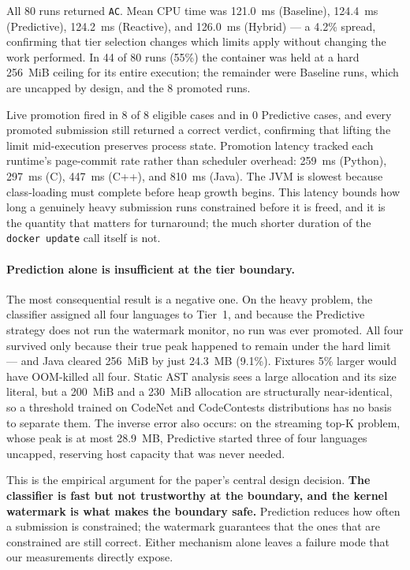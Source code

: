\documentclass[conference]{IEEEtran}
\begin{document}
All 80 runs returned \texttt{AC}. Mean CPU time was 121.0~ms (Baseline), 124.4~ms (Predictive), 124.2~ms (Reactive), and 126.0~ms (Hybrid) --- a 4.2\% spread, confirming that tier selection changes which limits apply without changing the work performed. In 44 of 80 runs (55\%) the container was held at a hard 256~MiB ceiling for its entire execution; the remainder were Baseline runs, which are uncapped by design, and the 8 promoted runs.

Live promotion fired in 8 of 8 eligible cases and in 0 Predictive cases, and every promoted submission still returned a correct verdict, confirming that lifting the limit mid-execution preserves process state. Promotion latency tracked each runtime's page-commit rate rather than scheduler overhead: 259~ms (Python), 297~ms (C), 447~ms (C++), and 810~ms (Java). The JVM is slowest because class-loading must complete before heap growth begins. This latency bounds how long a genuinely heavy submission runs constrained before it is freed, and it is the quantity that matters for turnaround; the much shorter duration of the \texttt{docker update} call itself is not.

\paragraph{Prediction alone is insufficient at the tier boundary.}
The most consequential result is a negative one. On the heavy problem, the classifier assigned all four languages to Tier~1, and because the Predictive strategy does not run the watermark monitor, no run was ever promoted. All four survived only because their true peak happened to remain under the hard limit --- and Java cleared 256~MiB by just 24.3~MB (9.1\%). Fixtures 5\% larger would have OOM-killed all four. Static AST analysis sees a large allocation and its size literal, but a 200~MiB and a 230~MiB allocation are structurally near-identical, so a threshold trained on CodeNet and CodeContests distributions has no basis to separate them. The inverse error also occurs: on the streaming top-K problem, whose peak is at most 28.9~MB, Predictive started three of four languages uncapped, reserving host capacity that was never needed.

This is the empirical argument for the paper's central design decision. \textbf{The classifier is fast but not trustworthy at the boundary, and the kernel watermark is what makes the boundary safe.} Prediction reduces how often a submission is constrained; the watermark guarantees that the ones that are constrained are still correct. Either mechanism alone leaves a failure mode that our measurements directly expose.
\end{document}
